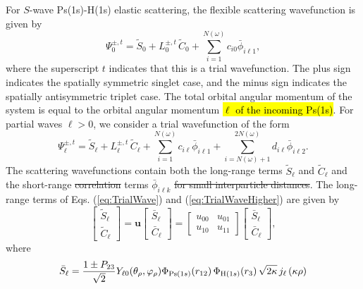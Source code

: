 \documentclass[preprint,showpacs,showkeys,preprintnumbers,amsmath,amssymb,longbibliography,pra,aps]{revtex4-1}
\begin{document}
For $S$-wave Ps(1s)-H(1s) elastic scattering, the flexible scattering
wavefunction is given by
\begin{equation}
\Psi_0^{\pm,t} = \widetilde{S}_0 + L_0^{\pm,t} \, \widetilde{C}_0
  + \sum_{i=1}^{N(\omega)} c_{i0} \bar{\phi}_{i\ell 1},
\label{eq:TrialWave}
\end{equation}
where the superscript $t$ indicates that this is a trial wavefunction. The plus
sign indicates the spatially symmetric singlet case, and the minus sign
indicates the spatially antisymmetric triplet case. The total orbital angular
momentum of the system is equal to the orbital angular momentum \hl{$\ell$ 
of the incoming Ps(1s)}. For partial waves $\ell > 0$, we consider a trial
wavefunction of the form
\begin{equation}
\Psi_\ell^{\pm,t} = \widetilde{S}_\ell + L^{\pm,t}_\ell \, \widetilde{C}_\ell
 + \sum_{i=1}^{N(\omega)} c_{i\ell} \bar{\phi}_{i\ell 1}
 + \!\!\!\sum_{i=N(\omega)+1}^{2N(\omega)} \!\! d_{i\ell} \bar{\phi}_{i\ell 2}.
\label{eq:TrialWaveHigher}
\end{equation}
The scattering wavefunctions contain both the long-range terms $\widetilde{S}_\ell$
and $\widetilde{C}_\ell$ and the short-range \sout{correlation} terms $\bar{\phi}_{i\ell k}$
\sout{for small interparticle distances}. The 
long-range terms of Eqs. (\ref{eq:TrialWave}) and (\ref{eq:TrialWaveHigher})
are given by
\begin{equation}
\label{eq:SCPhiDef}
\begin{bmatrix}
\widetilde{S}_\ell \\ \widetilde{C}_\ell
\end{bmatrix} = \textbf{u}  \begin{bmatrix}
\bar{S}_\ell \\ \bar{C}_\ell
\end{bmatrix} = \begin{bmatrix}
u_{00} & u_{01} \\  u_{10} & u_{11}
\end{bmatrix}
\begin{bmatrix}
\bar{S}_\ell \\ \bar{C}_\ell
\end{bmatrix}, 
\end{equation}
where
\begin{equation}
\label{eq:SBar}
\bar{S}_\ell = \frac{1\pm P_{23}}{\sqrt{2}}Y_{\ell 0}(\theta_\rho,
  \varphi_\rho)\Phi_{{\rm{Ps}}(1s)}\!\left(r_{12}\right) \Phi_{{\rm{H}}(1s)}\!\left(r_3\right)
  \sqrt{2\kappa} \,j_\ell\left(\kappa\rho\right)
\end{equation}
\end{document}

